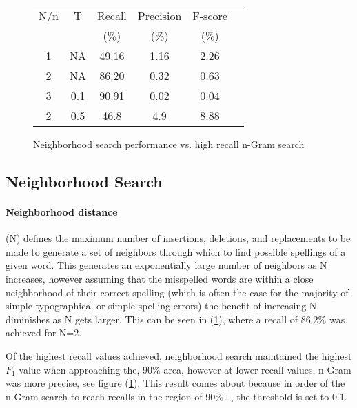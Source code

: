 \documentclass[twocolumn]{article}
\begin{document}
    \begin{figure}

        \begin{center}
        \begin{tabular}{|c|c|c|c|c|c|}
            \hline
            N/n & T & Recall & Precision & F-score \\
            &  & (\%) & (\%) & (\%)\\

            \hline\hline
            1 & NA & 49.16 & 1.16 & 2.26 \\
            2 & NA & 86.20 & 0.32 & 0.63 \\
            \hline\hline
            3 & 0.1& 90.91 & 0.02 & 0.04 \\
            2 & 0.5& 46.8  & 4.9  & 8.88 \\
            \hline
        \end{tabular}
        \end{center}
    \caption{Neighborhood search performance vs. high recall n-Gram search}
    \label{NeiTable}
\end{figure}

        \subsection{Neighborhood Search}
\paragraph{Neighborhood distance}
    (N) defines the maximum number of insertions, deletions, and replacements to be made to generate a set of neighbors
    through which to find possible spellings of a given word.
    This generates an exponentially large number of neighbors as N increases, however assuming that the misspelled words
    are within a close neighborhood of their correct spelling (which is often the case for the majority of simple
    typographical or simple spelling errors) the benefit of increasing N diminishes as N gets larger.
    This can be seen in (\ref{NeiTable}), where a recall of 86.2\% was achieved for N=2.

    Of the highest recall values achieved, neighborhood search maintained the highest $F_1$ value when approaching the,
    90\% area, however at lower recall values, n-Gram was more precise, see figure (\ref{NeiTable}).
    This result comes about because in order of the n-Gram search to reach recalls in the region of 90\%+, the threshold
    is set to 0.1.
\end{document}
